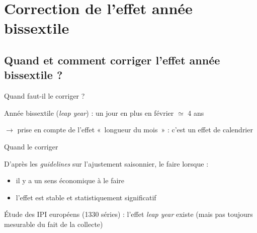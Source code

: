 \documentclass[10pt,xcolor=table,color={dvipsnames,usenames},ignorenonframetext,usepdftitle=false,french]{beamer}
\begin{document}
\section{Correction de l'effet année
bissextile}\label{correction-de-leffet-annee-bissextile}

\subsection{Quand et comment corriger l'effet année bissextile
?}\label{quand-et-comment-corriger-leffet-annee-bissextile}

\begin{frame}{Quand faut-il le corriger ?}

Année bissextile (\emph{leap year}) : un jour en plus en février
\(\simeq\) 4 ans

\(\rightarrow\) prise en compte de l'effet «~longueur du mois~» : c'est
un effet de calendrier

\medskip

Quand le corriger \bcquestion 

\medskip \pause

D'après les \emph{guidelines} sur l'ajustement saisonnier, le faire
lorsque :

\begin{itemize}
\item
  il y a un sens économique à le faire
\item
  l'effet est stable et statistiquement significatif
\end{itemize}

\medskip \pause
Étude des IPI européens (1330 séries) : l'effet \emph{leap year} existe
(mais pas toujours mesurable du fait de la collecte)

\end{frame}
\end{document}

